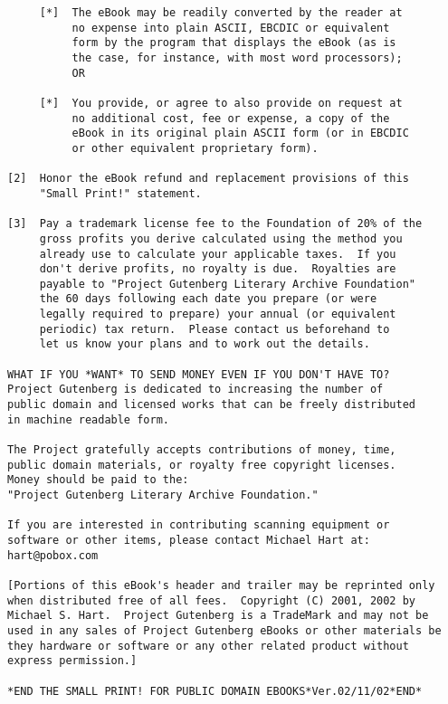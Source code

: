 \documentclass[oneside]{article}
\begin{document}
\begin{verbatim}
     [*]  The eBook may be readily converted by the reader at
          no expense into plain ASCII, EBCDIC or equivalent
          form by the program that displays the eBook (as is
          the case, for instance, with most word processors);
          OR

     [*]  You provide, or agree to also provide on request at
          no additional cost, fee or expense, a copy of the
          eBook in its original plain ASCII form (or in EBCDIC
          or other equivalent proprietary form).

[2]  Honor the eBook refund and replacement provisions of this
     "Small Print!" statement.

[3]  Pay a trademark license fee to the Foundation of 20% of the
     gross profits you derive calculated using the method you
     already use to calculate your applicable taxes.  If you
     don't derive profits, no royalty is due.  Royalties are
     payable to "Project Gutenberg Literary Archive Foundation"
     the 60 days following each date you prepare (or were
     legally required to prepare) your annual (or equivalent
     periodic) tax return.  Please contact us beforehand to
     let us know your plans and to work out the details.

WHAT IF YOU *WANT* TO SEND MONEY EVEN IF YOU DON'T HAVE TO?
Project Gutenberg is dedicated to increasing the number of
public domain and licensed works that can be freely distributed
in machine readable form.

The Project gratefully accepts contributions of money, time,
public domain materials, or royalty free copyright licenses.
Money should be paid to the:
"Project Gutenberg Literary Archive Foundation."

If you are interested in contributing scanning equipment or
software or other items, please contact Michael Hart at:
hart@pobox.com

[Portions of this eBook's header and trailer may be reprinted only
when distributed free of all fees.  Copyright (C) 2001, 2002 by
Michael S. Hart.  Project Gutenberg is a TradeMark and may not be
used in any sales of Project Gutenberg eBooks or other materials be
they hardware or software or any other related product without
express permission.]

*END THE SMALL PRINT! FOR PUBLIC DOMAIN EBOOKS*Ver.02/11/02*END*

\end{verbatim}
\normalsize
\end{document}
